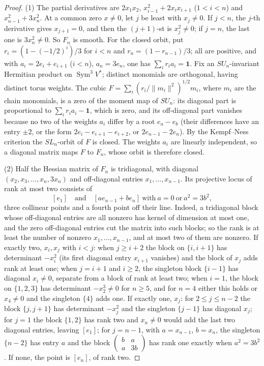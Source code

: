 \documentclass[11pt,a4paper]{article}
\theoremstyle{definition}
\newcommand{\one}{\mathbf{1}}
\newcommand{\Sym}{\operatorname{Sym}}
\begin{document}
\begin{proof}
(1) The partial derivatives are $2x_1x_2$, $x_{i-1}^2+2x_ix_{i+1}$
($1<i<n$) and $x_{n-1}^2+3x_n^2$. At a common zero $x\ne0$, let $j$ be least
with $x_j\ne0$. If $j<n$, the $j$-th derivative gives $x_{j+1}=0$, and then
the $(j+1)$-st is $x_j^2\ne0$; if $j=n$, the last one is $3x_n^2\ne0$. So
$F_n$ is smooth. For the closed orbit, put $r_i=(1-(-1/2)^i)/3$ for $i<n$ and
$r_n=(1-r_{n-1})/3$; all are positive, and with $a_i=2e_i+e_{i+1}$ ($i<n$),
$a_n=3e_n$, one has $\sum_ir_ia_i=\one$. Fix an $SU_n$-invariant Hermitian
product on $\Sym^3V^*$; distinct monomials are orthogonal, having distinct
torus weights. The cubic $F=\sum_i(r_i/\|m_i\|^2)^{1/2}m_i$, where $m_i$ are the
chain monomials, is a zero of the moment map of $SU_n$: its diagonal part is
proportional to $\sum_ir_ia_i-\one$, which is zero, and its off-diagonal part
vanishes because no two of the weights $a_i$ differ by a root $e_a-e_b$
(their differences have an entry $\pm2$, or the form $2e_i-e_{i+1}-e_{i+2}$, or
$2e_{n-1}-2e_n$). By the Kempf--Ness criterion \cite[Theorem 4, p.~1]{Losev}
the $SL_n$-orbit of $F$ is closed. The weights $a_i$ are linearly independent,
so a diagonal matrix maps $F$ to $F_n$, whose orbit is therefore closed.

(2) Half the Hessian matrix of $F_n$ is tridiagonal, with diagonal
$(x_2,x_3,\dots,x_n,3x_n)$ and off-diagonal entries $x_1,\dots,x_{n-1}$. Its
projective locus of rank at most two consists of
\begin{equation}\label{eq:hessianlocus}
 [e_1]\quad\text{and}\quad[ae_{n-1}+be_n]\ \text{with}\ a=0\ \text{or}\ a^2=3b^2 ,
\end{equation}
three collinear points and a fourth point off their line. Indeed, a tridiagonal
block whose off-diagonal entries are all nonzero has kernel of dimension at
most one, and the zero off-diagonal entries cut the matrix into such blocks; so
the rank is at least the number of nonzero $x_1,\dots,x_{n-1}$, and at most two
of them are nonzero. If exactly two, $x_i,x_j$ with $i<j$: when $j\ge i+2$ the
block on $\{i,i+1\}$ has determinant $-x_i^2$ (its first diagonal entry
$x_{i+1}$ vanishes) and the block of $x_j$ adds rank at least one; when $j=i+1$
and $i\ge2$, the singleton block $\{i-1\}$ has diagonal $x_i\ne0$, separate
from a block of rank at least two; when $i=1$, the block on $\{1,2,3\}$ has
determinant $-x_2^3\ne0$ for $n\ge5$, and for $n=4$ either this holds or
$x_4\ne0$ and the singleton $\{4\}$ adds one. If exactly one, $x_j$: for $2\le
j\le n-2$ the block $\{j,j+1\}$ has determinant $-x_j^2$ and the singleton
$\{j-1\}$ has diagonal $x_j$; for $j=1$ the block $\{1,2\}$ has rank two and
$x_n\ne0$ would add the last two diagonal entries, leaving $[e_1]$; for
$j=n-1$, with $a=x_{n-1}$, $b=x_n$, the singleton $\{n-2\}$ has entry $a$ and
the block $\left(\begin{smallmatrix}b&a\\a&3b\end{smallmatrix}\right)$ has rank
one exactly when $a^2=3b^2$. If none, the point is $[e_n]$, of rank two.


\end{proof}
\end{document}
